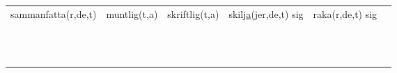\begin{center}
\begin{adjustwidth}{-2.5cm}{}
\begin{tabular}{|c c c c c c|}
            sammanfatta(r,de,t) & muntlig(t,a) & skriftlig(t,a) & skil\underline{ja}(jer,de,t) sig & raka(r,de,t) sig &  \\
             &  &  &  &  &  \\
             &  &  &  &  &  \\
             &  &  &  &  &  \\
             &  &  &  &  &  \\
             &  &  &  &  &  \\
             &  &  &  &  &  \\
             &  &  &  &  &  \\
             &  &  &  &  &  \\
             &  &  &  &  &  \\
             &  &  &  &  &  \\
             &  &  &  &  &  \\
             &  &  &  &  &  \\
            \hline
        \end{tabular}
    \end{adjustwidth}
\end{center}

